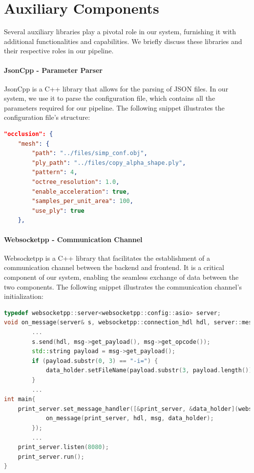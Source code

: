 \documentclass[11pt, a4paper,oneside,chapterprefix=false]{scrbook}
\begin{document}
\section{Auxiliary Components} \label{subsec:supporting libraries}

Several auxiliary libraries play a pivotal role in our system, furnishing it with additional functionalities and capabilities. We briefly discuss these libraries and their respective roles in our pipeline.

\paragraph{JsonCpp - Parameter Parser} \label{par:jsoncpp}

JsonCpp is a C++ library that allows for the parsing of JSON files. In our system, we use it to parse the configuration file, which contains all the parameters required for our pipeline. The following snippet illustrates the configuration file's structure:

\begin{lstlisting}[language=json, caption=Json Configuration File]
"occlusion": {
    "mesh": {
        "path": "../files/simp_conf.obj",
        "ply_path": "../files/copy_alpha_shape.ply",
        "pattern": 4,
        "octree_resolution": 1.0,
        "enable_acceleration": true,
        "samples_per_unit_area": 100,
        "use_ply": true
    },
\end{lstlisting}

\paragraph{Websocketpp - Communication Channel} \label{par:websocketpp}

Websocketpp is a C++ library that facilitates the establishment of a communication channel between the backend and frontend. It is a critical component of our system, enabling the seamless exchange of data between the two components. The following snippet illustrates the communication channel's initialization:

\begin{lstlisting}[language=C++, caption=Websocket Server]
typedef websocketpp::server<websocketpp::config::asio> server;
void on_message(server& s, websocketpp::connection_hdl hdl, server::message_ptr msg, DataHolder& data_holder) {
        ...
		s.send(hdl, msg->get_payload(), msg->get_opcode());
		std::string payload = msg->get_payload();
		if (payload.substr(0, 3) == "-i=") {
			data_holder.setFileName(payload.substr(3, payload.length()));
		}
		...
int main{
	print_server.set_message_handler([&print_server, &data_holder](websocketpp::connection_hdl hdl, server::message_ptr msg) {
            on_message(print_server, hdl, msg, data_holder);
        });
        ...
	print_server.listen(8080);
	print_server.run();
}
\end{lstlisting}
\end{document}

